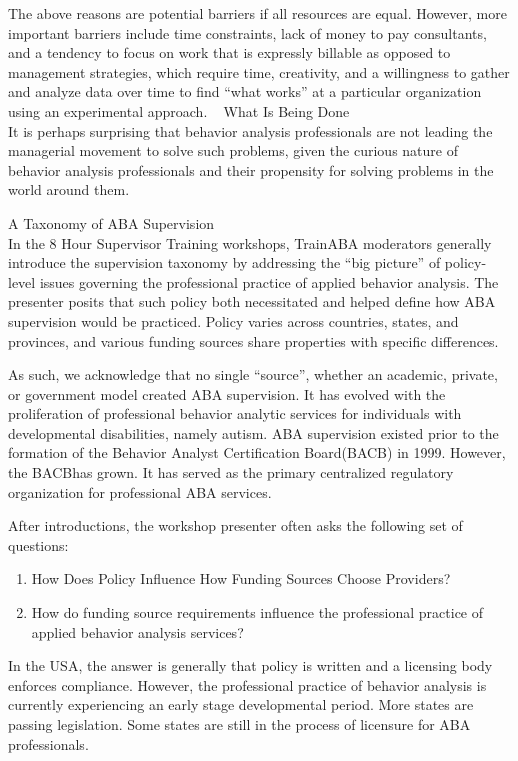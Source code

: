The above reasons are potential barriers if all resources are equal. However, more important barriers include time constraints, lack of money to pay consultants, and a tendency to focus on work that is expressly billable as opposed to management strategies, which require time, creativity, and a willingness to gather and analyze data over time to find ``what works'' at a particular organization using an experimental approach. 
 
What Is Being Done\\
It is perhaps surprising that behavior analysis professionals are not leading the managerial movement to solve such problems, given the curious nature of behavior analysis professionals and their propensity for solving problems in the world around them.

A Taxonomy of ABA Supervision\\
In the 8 Hour Supervisor Training workshops, TrainABA moderators generally introduce the supervision taxonomy by addressing the ``big picture'' of policy-level issues governing the professional practice of applied behavior analysis. The presenter posits that such policy both necessitated and helped define how ABA supervision would be practiced. Policy varies across countries, states, and provinces, and various funding sources share properties with specific differences. 

As such, we acknowledge that no single ``source'', whether an academic, private, or government model created ABA supervision. It has evolved with the proliferation of professional behavior analytic services for individuals with developmental disabilities, namely autism. ABA supervision existed prior to the formation of the Behavior Analyst Certification Board\textregistered (BACB\textregistered) in 1999. However, the BACB\textregistered has grown. It has served as the primary centralized regulatory organization for professional ABA services.

After introductions, the workshop presenter often asks the following set of questions:

\begin{enumerate}
\item How Does Policy Influence How Funding Sources Choose Providers? 
\item How do funding source requirements influence the professional practice of applied behavior analysis services?
\end{enumerate}

In the USA, the answer is generally that policy is written and a licensing body enforces compliance. However, the professional practice of behavior analysis is currently experiencing an early stage developmental period. More states are passing legislation. Some states are still in the process of licensure for ABA professionals. 

